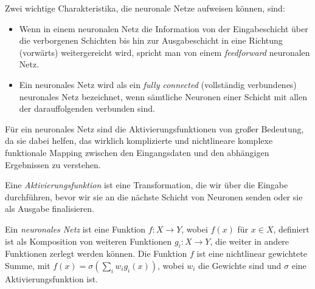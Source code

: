 %        
%        
%        
%        
%        
%    
%    
Zwei wichtige Charakteristika, die neuronale Netze aufweisen können, sind:
\begin{itemize}
\item Wenn in einem neuronalen Netz die Information von der Eingabeschicht über die verborgenen Schichten bis hin zur Ausgabeschicht in eine Richtung (\glqq vorwärts\grqq) weitergereicht wird, spricht man von einem \textit{feedforward} neuronalen Netz.
\item Ein neuronales Netz wird als ein \textit{fully connected} (\glqq vollständig verbundenes\grqq\@) neuronales Netz bezeichnet, wenn sämtliche Neuronen einer Schicht mit allen der darauffolgenden verbunden sind. 
\end{itemize}
Für ein neuronales Netz sind die Aktivierungsfunktionen von großer Bedeutung, da sie dabei helfen, das wirklich komplizierte und nichtlineare komplexe funktionale Mapping zwischen den Eingangsdaten und den abhängigen Ergebnissen zu verstehen.
\begin{defn}
Eine \emph{Aktivierungsfunktion} ist eine Transformation, die wir über die Eingabe durchführen, bevor wir sie an die nächste Schicht von Neuronen senden oder sie als Ausgabe finalisieren.
\end{defn}
\begin{defn}
Ein \emph{neuronales Netz} ist eine Funktion $f\colon X \to Y$, wobei $f(x)$ für $x \in X$, definiert ist als Komposition von weiteren Funktionen $g_i \colon X \to Y$, die weiter in andere Funktionen zerlegt werden können.
Die Funktion $f$ ist eine nichtlinear gewichtete Summe, mit $f(x) =  \sigma(\sum_iw_ig_i(x))$, wobei $w_i$ die Gewichte sind und $\sigma$ eine Aktivierungsfunktion ist.
\end{defn}
